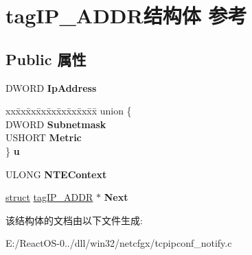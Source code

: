\hypertarget{structtag_i_p___a_d_d_r}{}\section{tag\+I\+P\+\_\+\+A\+D\+D\+R结构体 参考}
\label{structtag_i_p___a_d_d_r}
\subsection*{Public 属性}
\begin{DoxyCompactItemize}
\item 
\mbox{\label{structtag_i_p___a_d_d_r_a6eab6109caed324aa2131c4eea1bfcf9}} 
D\+W\+O\+RD {\bfseries Ip\+Address}
\item 
\mbox{\label{structtag_i_p___a_d_d_r_ac382f84965df20176518ae47db8fc194}} 
\begin{tabbing}
xx\=xx\=xx\=xx\=xx\=xx\=xx\=xx\=xx\=\kill
union \{\\
\>DWORD {\bfseries Subnetmask}\\
\>USHORT {\bfseries Metric}\\
\} {\bfseries u}\\

\end{tabbing}\item 
\mbox{\label{structtag_i_p___a_d_d_r_a5f280c7225ee58dcd95eb7f3108de7e9}} 
U\+L\+O\+NG {\bfseries N\+T\+E\+Context}
\item 
\mbox{\label{structtag_i_p___a_d_d_r_ab124ca8340fe243db1a5b73db4fd5efc}} 
\hyperlink{interfacestruct}{struct} \hyperlink{structtag_i_p___a_d_d_r}{tag\+I\+P\+\_\+\+A\+D\+DR} $\ast$ {\bfseries Next}
\end{DoxyCompactItemize}


该结构体的文档由以下文件生成\+:\begin{DoxyCompactItemize}
\item 
E\+:/\+React\+O\+S-\/0../dll/win32/netcfgx/tcpipconf\+\_\+notify.\+c\end{DoxyCompactItemize}
